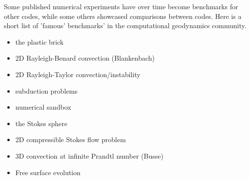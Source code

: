 Some published numerical experiments have over time become benchmarks for other codes, while some 
others showcased comparisons between codes. Here is a short list of 'famous' benchmarks' in the 
computational geodynamics community.

\begin{itemize}
\item the plastic brick \cite{lemm08,kaus10,qurj09}
\item 2D Rayleigh-Benard convection (Blankenbach)  \cite{blbc89,trha98,chhl08,king09,lezh11,vyrc13,trab90}
\item 2D Rayleigh-Taylor convection/instability \cite{pros81,trab90,soga01,taki03,bomh06, basd08,qurj09,saev10,lezh11,vyrc13,vkks97,} 
\item subduction problems \cite{scbe08,vack08}
\item numerical sandbox \cite{bbeg06,busa16}
\item the Stokes sphere \cite{galemanual}
\item 2D compressible Stokes flow problem \cite{lezh08}
\item 3D convection at infinite Prandtl number (Busse) \cite{bucc93,trha98}
\item Free surface evolution \cite{crsg12}
\end{itemize}

